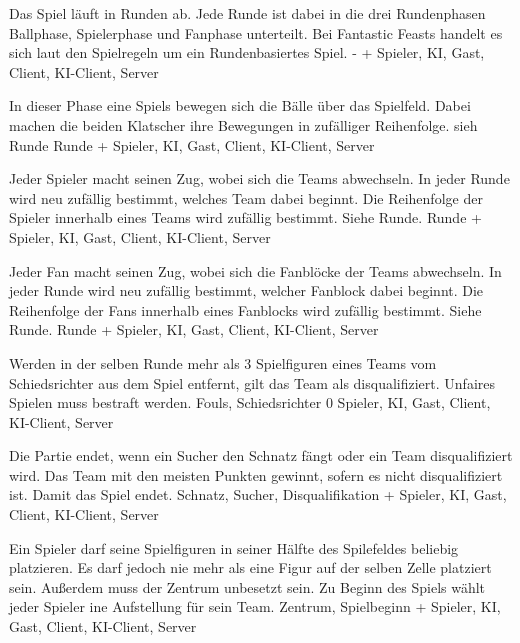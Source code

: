         {Das Spiel läuft in Runden ab. Jede Runde ist dabei in die drei Rundenphasen Ballphase, Spielerphase und Fanphase unterteilt.}
        {Bei \glqq{}Fantastic Feasts\grqq{} handelt es sich laut den Spielregeln um ein Rundenbasiertes Spiel.}
        {-}
        {+}
        {Spieler, KI, Gast, Client, KI-Client, Server}

        {In dieser Phase eine Spiels bewegen sich die Bälle über das Spielfeld. Dabei machen die beiden Klatscher ihre Bewegungen in zufälliger Reihenfolge.}
        {sieh Runde}
        {Runde}
        {+}
        {Spieler, KI, Gast, Client, KI-Client, Server}
        
        {Jeder Spieler macht seinen Zug, wobei sich die Teams abwechseln. In jeder Runde wird neu zufällig bestimmt, welches Team dabei beginnt. Die Reihenfolge der Spieler innerhalb eines Teams wird zufällig bestimmt.}
        {Siehe Runde.}
        {Runde}
        {+}
        {Spieler, KI, Gast, Client, KI-Client, Server}
        
        {Jeder Fan macht seinen Zug, wobei sich die Fanblöcke der Teams abwechseln. In jeder Runde wird neu zufällig bestimmt, welcher Fanblock dabei beginnt. Die Reihenfolge der Fans innerhalb eines Fanblocks wird zufällig bestimmt.}
        {Siehe Runde.}
        {Runde}
        {+}
        {Spieler, KI, Gast, Client, KI-Client, Server}

        {Werden in der selben Runde mehr als 3 Spielfiguren eines Teams vom Schiedsrichter aus dem Spiel entfernt, gilt das Team als disqualifiziert.}
        {Unfaires Spielen muss bestraft werden.}
        {Fouls, Schiedsrichter}
        {0}
        {Spieler, KI, Gast, Client, KI-Client, Server}
        
        {Die Partie endet, wenn ein Sucher den Schnatz fängt oder ein Team disqualifiziert wird. Das Team mit den meisten Punkten gewinnt, sofern es nicht disqualifiziert ist.}
        {Damit das Spiel endet.}
        {Schnatz, Sucher, Disqualifikation}
        {+}
        {Spieler, KI, Gast, Client, KI-Client, Server}
        
        {Ein Spieler darf seine Spielfiguren in seiner Hälfte des Spilefeldes beliebig platzieren. Es darf jedoch nie mehr als eine Figur auf der selben Zelle platziert sein. Außerdem muss der Zentrum unbesetzt sein.}
        {Zu Beginn des Spiels wählt jeder Spieler ine Aufstellung für sein Team.}
        {Zentrum, Spielbeginn}
        {+}
        {Spieler, KI, Gast, Client, KI-Client, Server}	
        
